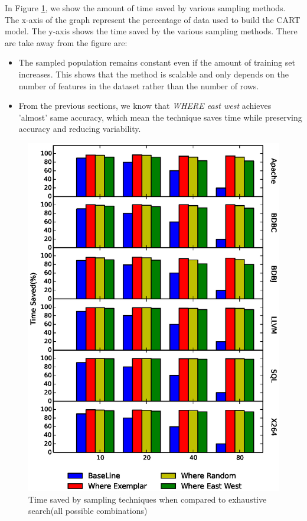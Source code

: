 \documentclass{sig-alternative}
\newcommand{\bi}{\begin{itemize}}%
\newcommand{\ei}{\end{itemize}}
\begin{document}
In Figure \ref{fig:time_saved}, we show the amount of time saved by various sampling methods. The x-axis of the graph represent the percentage of data used to build the CART model. The y-axis shows the time saved by the various sampling methods. There are take away from the figure are:
\bi
    \item{The sampled population remains constant even if the amount of training set increases. This shows that the method is scalable and only depends on the number of features in the dataset rather than the number of rows.}
    \item{From the previous sections, we know that \textit{WHERE east west} achieves 'almost' same accuracy,
    which mean the technique saves time while preserving accuracy and reducing variability.}
\ei
\begin{figure}[!t]
\includegraphics[width=0.9\linewidth]{Figures/performance_graph.eps}
\caption{Time saved by sampling techniques when compared to exhaustive search(all possible combinations)}\label{fig:time_saved}
\end{figure}
\end{document}
